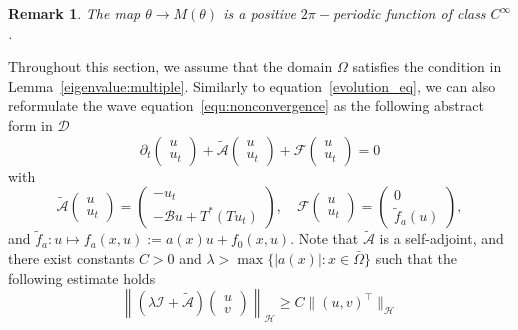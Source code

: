 \documentclass{elsarticle}
\newtheorem{remark}{Remark}[section]
\begin{document}
\begin{remark}
The map $\theta\rightarrow M(\theta)$ is a positive $2\pi-$periodic function of class $C^{\infty}$.
\end{remark}

Throughout this section, we assume that the domain $\Omega$ satisfies the condition in Lemma~\ref{eigenvalue:multiple}. Similarly to equation~\eqref{evolution_eq}, we can also reformulate the wave equation~\eqref{equ:nonconvergence} as the following abstract form in $\mathcal{D}$
\begin{equation} \label{evolu_equ:nonconvergence}
\partial_t\left(
\begin{array}{c}
u \\
u_t
\end{array}
\right)
+\tilde{\mathcal{A}}
\left(
\begin{array}{c}
u \\
u_t
\end{array}
\right)
+
\mathcal{F}\left(
\begin{array}{c}
u \\
u_t
\end{array}
\right)
=0
\end{equation}
with
 \begin{equation*}
\tilde{\mathcal{A}}\left(
\begin{array}{c}
u \\
u_t
\end{array}
\right)
=
\left(
\begin{array}{c}
-u_t\\
-\mathcal{B}u + T^{\ast}\left(Tu_t\right)
\end{array}
\right),
\quad
\mathcal{F}\left(
\begin{array}{c}
u \\
u_t
\end{array}
\right)
=\left(
\begin{array}{c}
0 \\
\tilde{f}_a(u)
\end{array}
\right),
\end{equation*}
and $\tilde{f}_a: u\mapsto f_a(x, u) := a(x)u + f_0(x, u)$. Note that $\tilde{\mathcal{A}}$ is a self-adjoint, and there exist constants $C>0$ and $\lambda>\max\{|a(x)|: x\in\bar{\Omega}\}$ such that the following estimate holds
\[
\left\|(\lambda\mathcal{I} + \tilde{\mathcal{A}})\left(
\begin{array}{c}
u \\
v
\end{array}
\right)\right\|_{\mathcal{H}}\geqslant C\|(u, v)^\top\|_{\mathcal{H}}
\]
\end{document}
